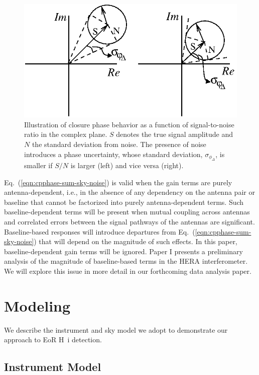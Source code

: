 \documentclass[
reprint,
superscriptaddress,
amsmath,
amssymb,
aps,
prd
]{revtex4-1}
\begin{document}
\begin{figure}[htb]
\includegraphics{phasor}
\caption{Illustration of closure phase behavior as a function of signal-to-noise ratio in the complex plane. $S$ denotes the true signal amplitude and $N$ the standard deviation from noise. The presence of noise introduces a phase uncertainty, whose standard deviation, $\sigma_{\phi_\Delta}$, is smaller if $S/N$ is larger (left) and vice versa (right). \label{fig:cpphase-cartoon}}
\end{figure}

Eq.~(\ref{eqn:cpphase-sum-sky-noise}) is valid when the gain terms are purely antenna-dependent, i.e., in the absence of any dependency on the antenna pair or baseline that cannot be factorized into purely antenna-dependent terms. Such baseline-dependent terms will be present when mutual coupling across antennas and correlated errors between the signal pathways of the antennas are significant. Baseline-based responses will introduce departures from Eq.~(\ref{eqn:cpphase-sum-sky-noise}) that will depend on the magnitude of such effects. In this paper, baseline-dependent gain terms will be ignored. Paper I presents a preliminary analysis of the magnitude of baseline-based terms in the HERA interferometer. We will explore this issue in more detail in our forthcoming data analysis paper. 

\section{Modeling}\label{sec:modeling}

We describe the instrument and sky model we adopt to demonstrate our approach to EoR H~{\sc i} detection. 

\subsection{Instrument Model}\label{sec:instrument}
\end{document}
